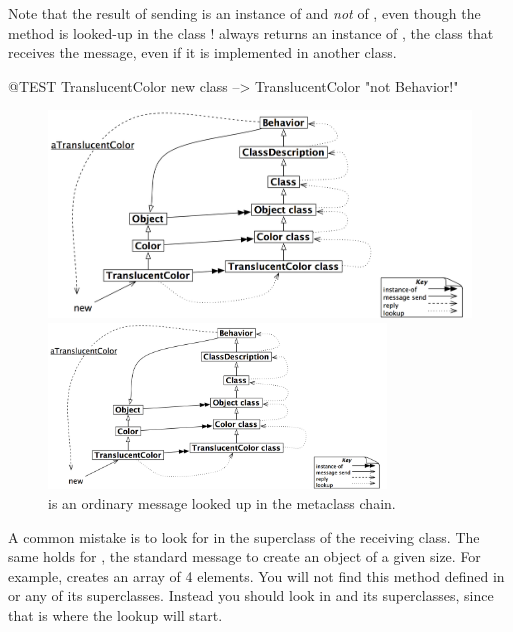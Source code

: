 \documentclass[a4paper,10pt,twoside]{book}
\begin{document}
Note that the result of sending  is an instance of  and \emph{not} of , even though the method is looked-up in the class !   always returns an instance of \self, the class that receives the message, even if it is implemented in another class.

\begin{code}{@TEST}
TranslucentColor new class --> TranslucentColor    "not Behavior!"
\end{code}

\begin{center}
\begin{figure}
\ifluluelse
	{\centerline{\includegraphics[width=\textwidth]{TranslucentSendingNew}}}
	{\centerline{\includegraphics[width=0.8\textwidth]{TranslucentSendingNew}}}
\caption{ is an ordinary message looked up in the metaclass chain.\label{fig:sendingnew}}
\end{figure}
\end{center}

A common mistake is to look for  in the superclass of the receiving class. The same holds for , the standard message to create an object of a given size.
For example,  creates an array of 4 elements.
You will not find this method defined in  or any of its superclasses.
Instead you should look in  and its superclasses, since that is where the lookup will start.
\end{document}
